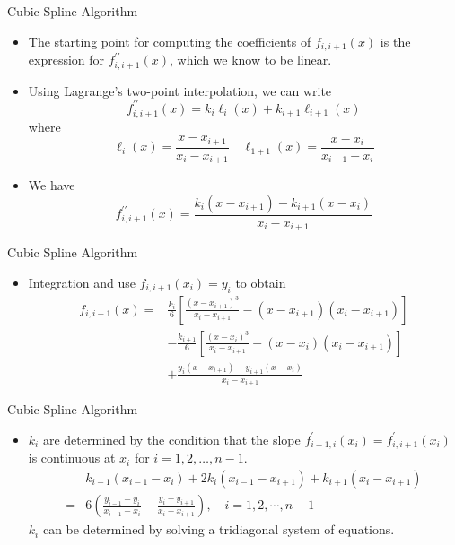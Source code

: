 \documentclass{beamer}
\begin{document}
\begin{frame}{Cubic Spline Algorithm}
  \begin{itemize}
    \item The starting point for computing the coefficients of $f_{i, i+1}(x)$ is the expression for $f_{i, i+1}^{\prime \prime}(x)$, which we know to be linear. 
    \item Using Lagrange's two-point interpolation, we can write  
    \[ 
    f_{i, i+1}^{\prime \prime}(x)=k_i \ell_i(x)+k_{i+1} \ell_{i+1}(x)
    \]
    where 
    \[
      \ell_i(x)=\frac{x-x_{i+1}}{x_i-x_{i+1}} \quad \ell_{1+1}(x)=\frac{x-x_i}{x_{i+1}-x_i}
    \]
    \item We have 
    \[ 
    f_{i, i+1}^{\prime \prime}(x)=\frac{k_i\left(x-x_{i+1}\right)-k_{i+1}\left(x-x_i\right)}{x_i-x_{i+1}}
    \]
  \end{itemize}
\end{frame}  
\begin{frame}{Cubic Spline Algorithm}
  \begin{itemize}
    \item Integration and use $f_{i, i+1}(x_i)=y_i$ to obtain
    \[ 
    \begin{aligned}
      f_{i, i+1}(x)= & \frac{k_i}{6}\left[\frac{\left(x-x_{i+1}\right)^3}{x_i-x_{i+1}}-\left(x-x_{i+1}\right)\left(x_i-x_{i+1}\right)\right] \\
      & -\frac{k_{i+1}}{6}\left[\frac{\left(x-x_i\right)^3}{x_i-x_{i+1}}-\left(x-x_i\right)\left(x_i-x_{i+1}\right)\right] \\
      & +\frac{y_i\left(x-x_{i+1}\right)-y_{i+1}\left(x-x_i\right)}{x_i-x_{i+1}}
      \end{aligned}
      \]
      
  \end{itemize}
\end{frame}  


\begin{frame}{Cubic Spline Algorithm}
  \begin{itemize}
  

  \item $k_i$ are determined by the condition that the slope   $f_{i-1, i}^{\prime}\left(x_i\right)=f_{i, i+1}^{\prime}\left(x_i\right)$  is continuous at $x_i$ for $i=1,2, \ldots, n-1$.
  \[
    \begin{aligned} 
      & k_{i-1}\left(x_{i-1}-x_i\right)+2 k_i\left(x_{i-1}-x_{i+1}\right)+k_{i+1}\left(x_i-x_{i+1}\right) \\ 
      = & 6\left(\frac{y_{i-1}-y_i}{x_{i-1}-x_i}-\frac{y_i-y_{i+1}}{x_i-x_{i+1}}\right), \quad i=1,2, \cdots, n-1
    \end{aligned}
  \]
   $k_i$ can be determined by solving a tridiagonal system of equations.
\end{itemize}
\end{frame}
\end{document}
